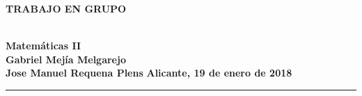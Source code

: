 \documentclass[a4paper,11pt,spanish,answers]{exam}
\newcommand{\PROJECTTITLE}{TRABAJO EN GRUPO}
\newcommand{\MyName}{Jose Manuel Requena Plens}
\begin{document}
\begin{coverpages}
	\begin{center}
	\begin{figure}[h]
	\end{figure}
	\vspace*{2.5cm}
	\begin{Large}
		\textbf{\PROJECTTITLE}
	\end{Large}
	\vspace*{1cm}
	\begin{large}
	\\
		\textbf{{\small Matemáticas II}\\[20pt]
		Gabriel Mejía Melgarejo\\
		\MyName}
		\vspace*{2cm}
		\vspace*{2cm}
	\vfill
		\textbf{Alicante, 19 de enero de 2018}
	\end{large}
\end{center}
\end{coverpages}
\tableofcontents

\noindent\rule[-1ex]{\textwidth}{2pt}\\[3.5ex] %
\setcounter{page}{1}

\lhead{}
\chead{}
\rhead{}
\lfoot{}
\cfoot{
	\thepage
}
\rfoot{}


\end{document}
